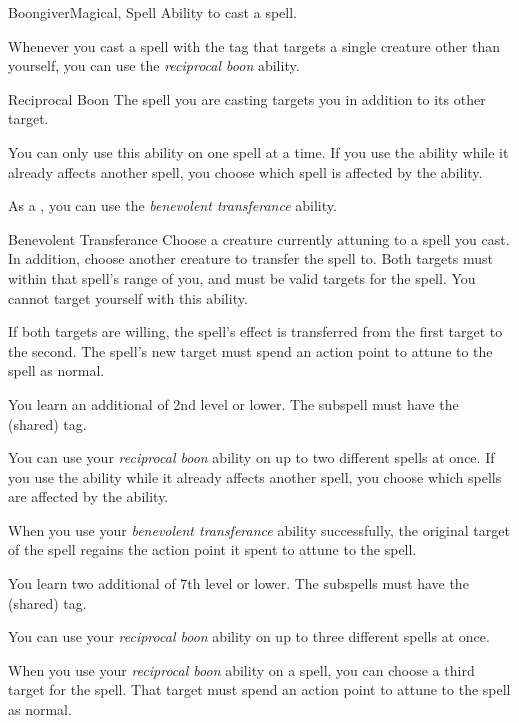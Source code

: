     \begin{feat}{Boongiver}{Magical, Spell}
        \featpre Ability to cast a spell.

         Whenever you cast a spell with the  tag that targets a single creature other than yourself, you can use the \textit{reciprocal boon} ability.
        \begin{ability}{Reciprocal Boon}
            The spell you are casting targets you in addition to its other target.

            You can only use this ability on one spell at a time.
            If you use the ability while it already affects another spell, you choose which spell is affected by the ability.
        \end{ability}

         As a , you can use the \textit{benevolent transferance} ability.
        \begin{ability}{Benevolent Transferance}
            Choose a creature currently attuning to a spell you cast.
            In addition, choose another creature to transfer the spell to.
            Both targets must within that spell's range of you, and must be valid targets for the spell.
            You cannot target yourself with this ability.

            If both targets are willing, the spell's effect is transferred from the first target to the second.
            The spell's new target must spend an action point to attune to the spell as normal.
        \end{ability}

         You learn an additional  of 2nd level or lower.
        The subspell must have the  (shared) tag.

         You can use your \textit{reciprocal boon} ability on up to two different spells at once.
        If you use the ability while it already affects another spell, you choose which spells are affected by the ability.

         When you use your \textit{benevolent transferance} ability successfully, the original target of the spell regains the action point it spent to attune to the spell.

         You learn two additional  of 7th level or lower.
        The subspells must have the  (shared) tag.

         You can use your \textit{reciprocal boon} ability on up to three different spells at once.

         When you use your \textit{reciprocal boon} ability on a spell, you can choose a third target for the spell.
        That target must spend an action point to attune to the spell as normal.
    \end{feat}

